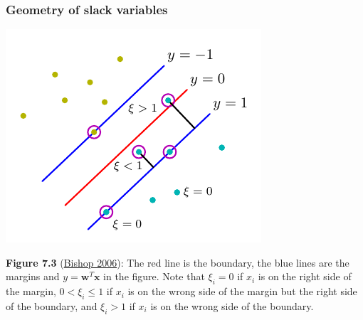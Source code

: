 \documentclass[ignorenonframetext,plain,fleqn]{beamer}
\begin{document}
\begin{frame}\frametitle{Geometry of slack variables} %
\begin{center}
\includegraphics[height=.6\textheight]{images/bishop-fig-7-3.pdf}
\end{center}
\footnotesize {\bf Figure 7.3}
(\href{http://research.microsoft.com/en-us/um/people/cmbishop/prml}{Bishop
  2006}): The red line is the boundary, the blue lines are the margins
and $y=\mathbf{w}^T\mathbf{x}$ in the figure.  Note that $\xi_i=0$ if
$x_i$ is on the right side of the margin, $0<\xi_i\leq 1$ if $x_i$ is
on the wrong side of the margin but the right side of the boundary,
and $\xi_i > 1$ if $x_i$ is on the wrong side of the boundary.
\end{frame}
\end{document}
